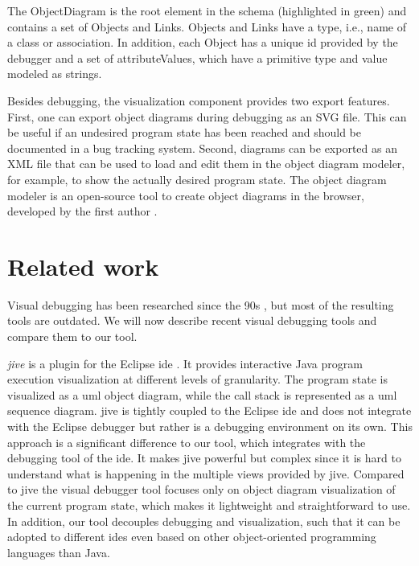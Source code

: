 \documentclass[conference]{IEEEtran}
\begin{document}
The \textsf{ObjectDiagram} is the root element in the schema (highlighted in green) and contains a set of \textsf{Objects} and \textsf{Links}.
\textsf{Objects} and \textsf{Links} have a \textsf{type}, i.e., name of a class or association.
In addition, each \textsf{Object} has a unique id provided by the debugger and a set of \textsf{attributeValues}, which have a primitive \textsf{type} and \textsf{value} modeled as strings.

Besides debugging, the visualization component provides two export features.
First, one can export object diagrams during debugging as an SVG file.
This can be useful if an undesired program state has been reached and should be documented in a bug tracking system.
Second, diagrams can be exported as an XML file that can be used to load and edit them in the object diagram modeler, for example, to show the actually desired program state.
The object diagram modeler is an open-source tool to create object diagrams in the browser, developed by the first author \cite{ObjectDiagramModeler2022}.

\section{Related work} \label{sec:relatedWork}
Visual debugging has been researched since the 90s \cite{baeza-yatesVisualDebuggingAutomatic1996, jerdingUsingVisualizationFoster1994, mukherjeaVisualDebuggingIntegrating1994, hansonSimpleExtensibleGraphical1997}, but most of the resulting tools are outdated.
We will now describe recent visual debugging tools and compare them to our tool.

\textit{\gls*{jive}} is a plugin for the Eclipse \gls*{ide} \cite{czyzDeclarativeVisualDebugging2007,k.p.FiniteStateModel2021, JIVEJavaInteractive}.
It provides interactive Java program execution visualization at different levels of granularity.
The program state is visualized as a \gls*{uml} object diagram, while the call stack is represented as a \gls*{uml} sequence diagram.
\gls*{jive} is tightly coupled to the Eclipse \gls*{ide} and does not integrate with the Eclipse debugger but rather is a debugging environment on its own.
This approach is a significant difference to our tool, which integrates with the debugging tool of the \gls*{ide}.
It makes \gls*{jive} powerful but complex since it is hard to understand what is happening in the multiple views provided by \gls*{jive}.
Compared to \gls*{jive} the visual debugger tool focuses only on object diagram visualization of the current program state, which makes it lightweight and straightforward to use.
In addition, our tool decouples debugging and visualization, such that it can be adopted to different \glspl*{ide} even based on other object-oriented programming languages than Java.
\end{document}
